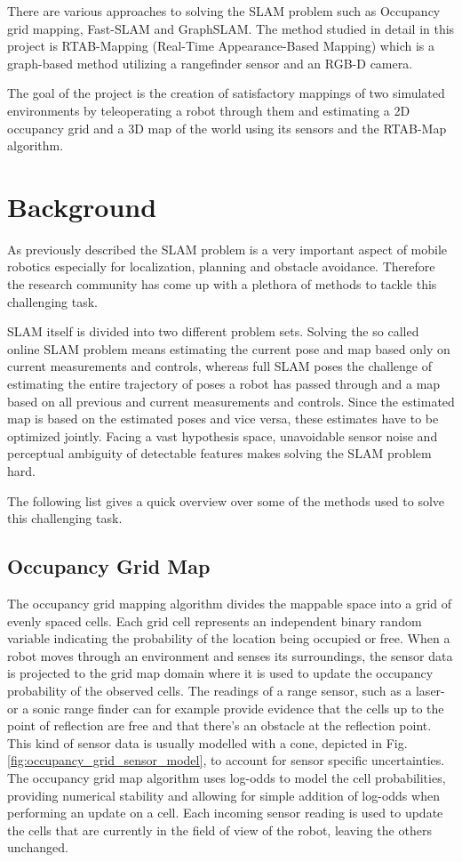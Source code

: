 \documentclass[10pt,journal,compsoc]{IEEEtran}
\begin{document}
There are various approaches to solving the SLAM problem such as Occupancy grid mapping, Fast-SLAM and GraphSLAM. The method studied in detail in this project is RTAB-Mapping (Real-Time Appearance-Based Mapping) which is a graph-based method utilizing a rangefinder sensor and an RGB-D camera.

The goal of the project is the creation of satisfactory mappings of two simulated environments by teleoperating a robot through them and estimating a 2D occupancy grid and a 3D map of the world using its sensors and the RTAB-Map algorithm.


\section{Background}

As previously described the SLAM problem is a very important aspect of mobile robotics especially for localization, planning and obstacle avoidance. Therefore the research community has come up with a plethora of methods to tackle this challenging task.

SLAM itself is divided into two different problem sets. Solving the so called online SLAM problem means estimating the current pose and map based only on current measurements and controls, whereas full SLAM poses the challenge of estimating the entire trajectory of poses a robot has passed through and a map based on all previous and current measurements and controls.
Since the estimated map is based on the estimated poses and vice versa, these estimates have to be optimized jointly. Facing a vast hypothesis space, unavoidable sensor noise and perceptual ambiguity of detectable features makes solving the SLAM problem hard.

The following list gives a quick overview over some of the methods used to solve this challenging task.

\subsection{Occupancy Grid Map}

The occupancy grid mapping algorithm divides the mappable space into a grid of evenly spaced cells. Each grid cell represents an independent binary random variable indicating the probability of the location being occupied or free. When a robot moves through an environment and senses its surroundings, the sensor data is projected to the grid map domain where it is used to update the occupancy probability of the observed cells. The readings of a range sensor, such as a laser- or a sonic range finder can for example provide evidence that the cells up to the point of reflection are free and that there's an obstacle at the reflection point. This kind of sensor data is usually modelled with a cone, depicted in Fig.\ref{fig:occupancy_grid_sensor_model}, to account for sensor specific uncertainties.
The occupancy grid map algorithm uses log-odds to model the cell probabilities, providing numerical stability and allowing for simple addition of log-odds when performing an update on a cell. Each incoming sensor reading is used to update the cells that are currently in the field of view of the robot, leaving the others unchanged.
\end{document}
